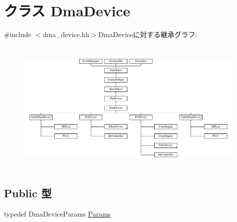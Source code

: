 \hypertarget{classDmaDevice}{
\section{クラス DmaDevice}
\label{classDmaDevice}
}


{\ttfamily \#include $<$dma\_\-device.hh$>$}DmaDeviceに対する継承グラフ:\begin{figure}[H]
\begin{center}
\leavevmode
\includegraphics[height=6.5812cm]{classDmaDevice}
\end{center}
\end{figure}
\subsection*{Public 型}
\begin{DoxyCompactItemize}
\item 
typedef DmaDeviceParams \hyperlink{classDmaDevice_aea7daf6105ab956443385f5f5a9b88c5}{Params}
\end{DoxyCompactItemize}
